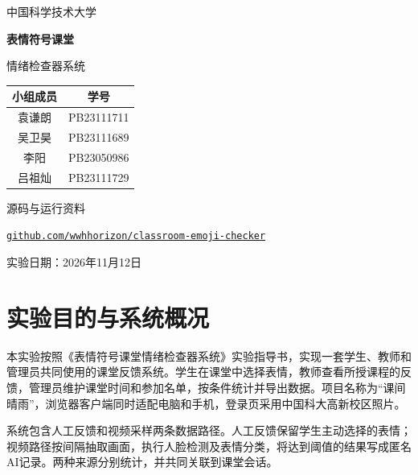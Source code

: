 \documentclass[UTF8,a4paper,zihao=-4,fontset=fandol]{ctexart}
\begin{document}
\begin{titlepage}
\centering\linespread{1.1}\selectfont
\vspace*{10mm}
{\heiti 中国科学技术大学\par}
\vspace{6mm}{\large 软件工程实践\par}
\vspace{23mm}
{\bfseries\color{ink} 表情符号课堂\par 情绪检查器系统\par}
\vspace{14mm}{\large 项目名称：课间晴雨\par}
\vspace{3mm}{\large 应用场景：高新校区课堂反馈与管理\par}
\vspace{13mm}
\begin{tabular}{cc}
\toprule 小组成员 & 学号\\\midrule
袁谦朗 & PB23111711\\
吴卫昊 & PB23111689\\
李阳 & PB23050986\\
吕祖灿 & PB23111729\\\bottomrule
\end{tabular}
\vfill
源码与运行资料\par
\href{https://github.com/wwhhorizon/classroom-emoji-checker}{\nolinkurl{github.com/wwhhorizon/classroom-emoji-checker}}\par
\vspace{7mm}实验日期：2026年11月12日
\end{titlepage}
\tableofcontents\clearpage
{}

\section{实验目的与系统概况}

本实验按照《表情符号课堂情绪检查器系统》实验指导书，实现一套学生、教师和管理员共同使用的课堂反馈系统。学生在课堂中选择表情，教师查看所授课程的反馈，管理员维护课堂时间和参加名单，按条件统计并导出数据。项目名称为“课间晴雨”，浏览器客户端同时适配电脑和手机，登录页采用中国科大高新校区照片。

系统包含人工反馈和视频采样两条数据路径。人工反馈保留学生主动选择的表情；视频路径按间隔抽取画面，执行人脸检测及表情分类，将达到阈值的结果写成匿名AI记录。两种来源分别统计，并共同关联到课堂会话。
\end{document}
